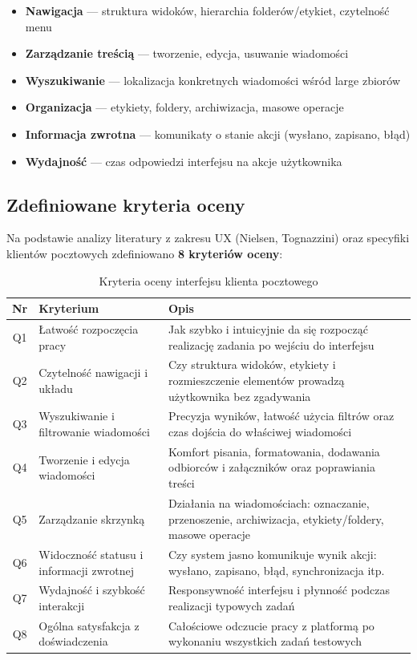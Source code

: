 \documentclass[12pt,a4paper]{article}
\begin{document}
\begin{itemize}[noitemsep]
    \item \textbf{Nawigacja} --- struktura widoków, hierarchia folderów/etykiet, czytelność menu
    \item \textbf{Zarządzanie treścią} --- tworzenie, edycja, usuwanie wiadomości
    \item \textbf{Wyszukiwanie} --- lokalizacja konkretnych wiadomości wśród large zbiorów
    \item \textbf{Organizacja} --- etykiety, foldery, archiwizacja, masowe operacje
    \item \textbf{Informacja zwrotna} --- komunikaty o stanie akcji (wysłano, zapisano, błąd)
    \item \textbf{Wydajność} --- czas odpowiedzi interfejsu na akcje użytkownika
\end{itemize}

\subsection{Zdefiniowane kryteria oceny}

Na podstawie analizy literatury z zakresu UX (Nielsen, Tognazzini) oraz specyfiki klientów pocztowych zdefiniowano \textbf{8 kryteriów oceny}:

\begin{table}[H]
\centering
\caption{Kryteria oceny interfejsu klienta pocztowego}
\label{tab:kryteria}
\begin{tabularx}{\textwidth}{|c|X|X|}
\hline
\textbf{Nr} & \textbf{Kryterium} & \textbf{Opis} \\
\hline
Q1 & Łatwość rozpoczęcia pracy & Jak szybko i intuicyjnie da się rozpocząć realizację zadania po wejściu do interfejsu \\
\hline
Q2 & Czytelność nawigacji i układu & Czy struktura widoków, etykiety i rozmieszczenie elementów prowadzą użytkownika bez zgadywania \\
\hline
Q3 & Wyszukiwanie i filtrowanie wiadomości & Precyzja wyników, łatwość użycia filtrów oraz czas dojścia do właściwej wiadomości \\
\hline
Q4 & Tworzenie i edycja wiadomości & Komfort pisania, formatowania, dodawania odbiorców i załączników oraz poprawiania treści \\
\hline
Q5 & Zarządzanie skrzynką & Działania na wiadomościach: oznaczanie, przenoszenie, archiwizacja, etykiety/foldery, masowe operacje \\
\hline
Q6 & Widoczność statusu i informacji zwrotnej & Czy system jasno komunikuje wynik akcji: wysłano, zapisano, błąd, synchronizacja itp. \\
\hline
Q7 & Wydajność i szybkość interakcji & Responsywność interfejsu i płynność podczas realizacji typowych zadań \\
\hline
Q8 & Ogólna satysfakcja z doświadczenia & Całościowe odczucie pracy z platformą po wykonaniu wszystkich zadań testowych \\
\hline
\end{tabularx}
\end{table}
\end{document}
